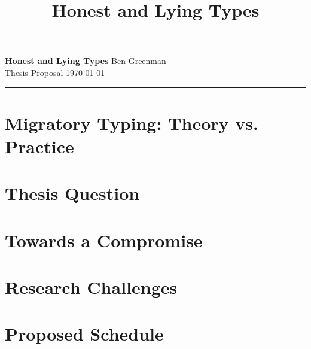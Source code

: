 \documentclass[10pt]{article}
\title{Honest and Lying Types}
\renewcommand{\maketitle}{\noindent\textbf{Honest and Lying Types} \hfill Ben Greenman\\Thesis Proposal \hfill \today\\\hrule}
\begin{document}

\maketitle

\begin{abstract}

\end{abstract}

\newcommand{\mksec}[3]{\section{#3} \label{#1} }



\mksec{sec:history}{history}{Migratory Typing: Theory vs. Practice}
\mksec{sec:thesis}{thesis}{Thesis Question}
\mksec{sec:done}{done}{Towards a Compromise}
\mksec{sec:todo}{todo}{Research Challenges}
\mksec{sec:schedule}{schedule}{Proposed Schedule}

\footnotesize

%

\end{document}
